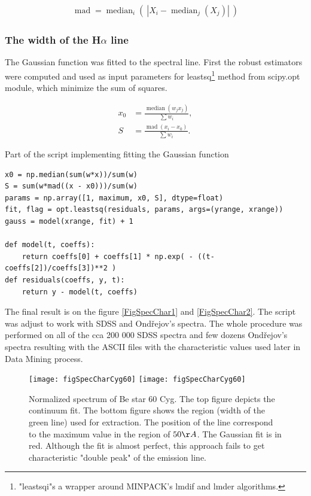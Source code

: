 \begin{align}
  \operatorname{mad} = \operatorname{median}_{i}\left(\ \left| X_{i} -
      \operatorname{median}_{j} (X_{j}) \right|\ \right)
\end{align}

\subsubsection{The width of the H$\alpha$ line}
The Gaussian function was fitted to the spectral line. First the
robust estimators were computed and used as input parameters for
leastsq\footnote{"leastsqi"s a wrapper around MINPACK’s lmdif and
  lmder algorithms.} method from scipy.opt module, which minimize the
sum of squares.

\begin{align}
  x_0 & = \frac{\operatorname{median}(w_jx_j)}{\sum{w_i}}, \\
  S & = \frac{\operatorname{mad}(x_i - x_0)}{\sum{w_i}}.
\end{align}

\cite{launer1979robustness}

Part of the script implementing fitting the Gaussian function

\begin{lstlisting}
x0 = np.median(sum(w*x))/sum(w)
S = sum(w*mad((x - x0)))/sum(w)
params = np.array([1, maximum, x0, S], dtype=float)
fit, flag = opt.leastsq(residuals, params, args=(yrange, xrange))
gauss = model(xrange, fit) + 1

def model(t, coeffs):
    return coeffs[0] + coeffs[1] * np.exp( - ((t-coeffs[2])/coeffs[3])**2 )
def residuals(coeffs, y, t):
    return y - model(t, coeffs)
\end{lstlisting}

The final result is on the figure \ref{FigSpecChar1} and
\ref{FigSpecChar2}. The script was adjust to work with SDSS and
Ondřejov's spectra. The whole procedure was performed on all of the
cca 200 000 SDSS spectra and few dozens Ondřejov's spectra resulting
with the ASCII files with the characteristic values used later in Data
Mining process.

   \begin{figure}[!htbp]
      \begin{center}
        \leavevmode
        \ifpdf
        \texttt{[image: figSpecCharCyg60]}
        \else
        \texttt{[image: figSpecCharCyg60]}
        \fi
        \caption{Normalized spectrum of Be star 60 Cyg. The top figure
          depicts the continuum fit. The bottom figure shows the
          region (width of the green line) used for extraction. The
          position of the line correspond to the maximum value in the
          region of $50\AA$. The Gaussian fit is in red. Although the
          fit is almost perfect, this approach fails to get
          characteristic "double peak" of the emission line. }
        \label{FigSpecChar}
      \end{center}
    \end{figure}

